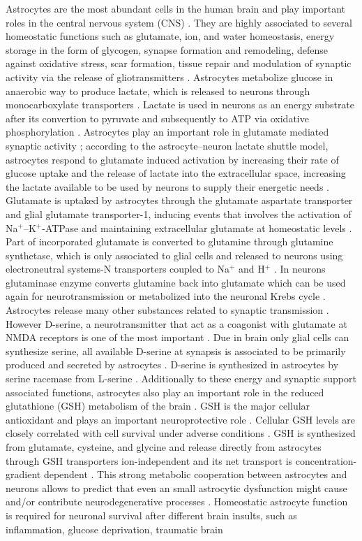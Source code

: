 Astrocytes are the most abundant cells in the human brain and play important roles in the central nervous system (CNS) \cite{Takuma2004}. They are highly associated to several homeostatic functions such as glutamate, ion, and water homeostasis, energy storage in the form of glycogen, synapse formation and remodeling, defense against oxidative stress, scar formation, tissue repair and modulation of synaptic activity via the release of gliotransmitters \cite{Lange2012}. Astrocytes metabolize glucose in anaerobic way to produce lactate, which is released to neurons through monocarboxylate transporters \cite{Kimelberg2010}. Lactate is used in neurons as an energy substrate after its convertion to pyruvate and subsequently to ATP via oxidative phosphorylation \cite{Allen2009}. Astrocytes play an important role in glutamate mediated synaptic activity \cite{Halassa2010}; according to the astrocyte–neuron lactate shuttle model, astrocytes respond to glutamate induced activation by increasing their rate of glucose uptake and the release of lactate into the extracellular space, increasing the lactate available to be used by neurons to supply their energetic needs \cite{Giaume2010}. Glutamate is uptaked by astrocytes through the glutamate aspartate transporter and glial glutamate transporter-1, inducing events that involves the activation of Na$^+$–K$^+$-ATPase and maintaining extracellular glutamate at homeostatic levels \cite{Nijboer2013}. Part of incorporated glutamate is converted to glutamine through glutamine synthetase, which is only associated to glial cells and released to neurons using electroneutral systems-N transporters coupled to Na$^+$ and H$^+$ \cite{Barres2008}. In neurons glutaminase enzyme converts glutamine back into glutamate which can be used again for neurotransmission or metabolized into the neuronal Krebs cycle \cite{Shen2013}. Astrocytes release many other substances related to synaptic transmission \cite{Petrelli2016}. However D-serine, a neurotransmitter that act as a coagonist with glutamate at NMDA receptors is one of the most important \cite{Halassa2010}. Due in brain only glial cells can synthesize serine, all available D-serine at synapsis is associated to be primarily produced and secreted by astrocytes \cite{Barres2008}. D-serine is synthesized in astrocytes by serine racemase from L-serine \cite{Durrant2014}. Additionally to these energy and synaptic support associated functions, astrocytes also play an important role in the reduced glutathione (GSH) metabolism of the brain \cite{Raps1989}. GSH is the major cellular antioxidant and plays an important neuroprotective role \cite{Jha2016}. Cellular GSH levels are closely correlated with cell survival under adverse conditions \cite{Allaman2011}. GSH is synthesized from glutamate, cysteine, and glycine and release directly from astrocytes through GSH transporters ion-independent and its net transport is concentration-gradient dependent \cite{Wang2000}. This strong metabolic cooperation between astrocytes and neurons allows to predict that even an small astrocytic dysfunction might cause and/or contribute neurodegenerative processes \cite{Maragakis2006}. Homeostatic astrocyte function is required for neuronal survival after different brain insults, such as inflammation, glucose deprivation, traumatic brain 